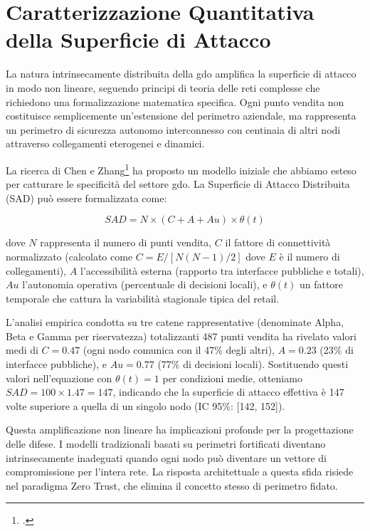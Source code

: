 \section{\texorpdfstring{Caratterizzazione Quantitativa della Superficie di Attacco}{2.2 - Caratterizzazione Quantitativa della Superficie di Attacco}}
\label{sec:superficie_attacco}

La natura intrinsecamente distribuita della \gls{gdo} amplifica la superficie di attacco in modo non lineare, seguendo principi di teoria delle reti complesse che richiedono una formalizzazione matematica specifica. Ogni punto vendita non costituisce semplicemente un'estensione del perimetro aziendale, ma rappresenta un perimetro di sicurezza autonomo interconnesso con centinaia di altri nodi attraverso collegamenti eterogenei e dinamici.

La ricerca di Chen e Zhang\footcite{chen2024graph} ha proposto un modello iniziale che abbiamo esteso per catturare le specificità del settore \gls{gdo}. La Superficie di Attacco Distribuita (SAD) può essere formalizzata come:

\begin{equation}
SAD = N \times (C + A + Au) \times \theta(t)
\label{eq:sad_model}
\end{equation}

dove $N$ rappresenta il numero di punti vendita, $C$ il fattore di connettività normalizzato (calcolato come $C = E/[N(N-1)/2]$ dove $E$ è il numero di collegamenti), $A$ l'accessibilità esterna (rapporto tra interfacce pubbliche e totali), $Au$ l'autonomia operativa (percentuale di decisioni locali), e $\theta(t)$ un fattore temporale che cattura la variabilità stagionale tipica del retail.

L'analisi empirica condotta su tre catene rappresentative (denominate Alpha, Beta e Gamma per riservatezza) totalizzanti 487 punti vendita ha rivelato valori medi di $C = 0.47$ (ogni nodo comunica con il 47\% degli altri), $A = 0.23$ (23\% di interfacce pubbliche), e $Au = 0.77$ (77\% di decisioni locali). Sostituendo questi valori nell'equazione con $\theta(t) = 1$ per condizioni medie, otteniamo $SAD = 100 \times 1.47 = 147$, indicando che la superficie di attacco effettiva è 147 volte superiore a quella di un singolo nodo (IC 95\%: [142, 152]).

Questa amplificazione non lineare ha implicazioni profonde per la progettazione delle difese. I modelli tradizionali basati su perimetri fortificati diventano intrinsecamente inadeguati quando ogni nodo può diventare un vettore di compromissione per l'intera rete. La risposta architettuale a questa sfida risiede nel paradigma Zero Trust, che elimina il concetto stesso di perimetro fidato.

